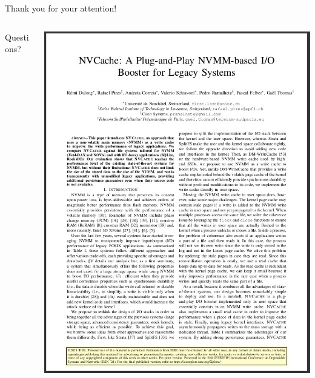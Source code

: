 \documentclass[presentation]{beamer}
\begin{document}
\begin{frame}[label={sec:org7dab81a}]{Thank you for your attention!}
\begin{columns}
\begin{column}{0.4\columnwidth}
\begin{block}{}
Questions?\\
\end{block}
\end{column}


\begin{column}{0.6\columnwidth}
\begin{block}{}
\begin{center}
\includegraphics[width=.9\linewidth]{./IMGs/paper.jpg}
\end{center}
\end{block}
\end{column}
\end{columns}
\end{frame}
\end{document}
